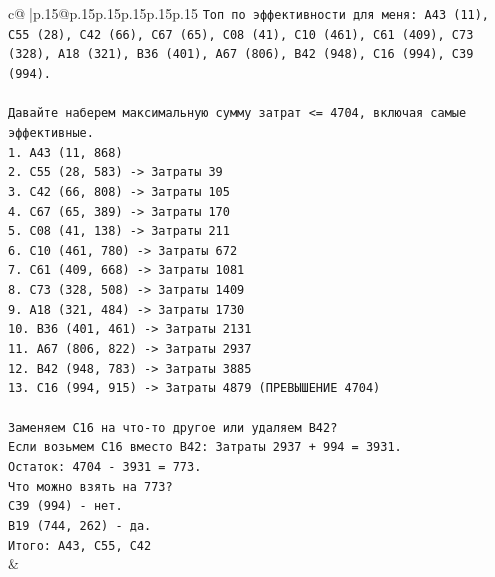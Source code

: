 \documentclass{article}
\begin{document}
{\begin{supertabular}{c@{$\;$}|p{.15\linewidth}@{}p{.15\linewidth}p{.15\linewidth}p{.15\linewidth}p{.15\linewidth}p{.15\linewidth}}
{{{\texttt{Топ по эффективности для меня: A43 (11), C55 (28), C42 (66), C67 (65), C08 (41), C10 (461), C61 (409), C73 (328), A18 (321), B36 (401), A67 (806), B42 (948), C16 (994), C39 (994).} \\
\\ 
\texttt{Давайте наберем максимальную сумму затрат <= 4704, включая самые эффективные.} \\
\texttt{1. A43 (11, 868)} \\
\texttt{2. C55 (28, 583) {-}> Затраты 39} \\
\texttt{3. C42 (66, 808) {-}> Затраты 105} \\
\texttt{4. C67 (65, 389) {-}> Затраты 170} \\
\texttt{5. C08 (41, 138) {-}> Затраты 211} \\
\texttt{6. C10 (461, 780) {-}> Затраты 672} \\
\texttt{7. C61 (409, 668) {-}> Затраты 1081} \\
\texttt{8. C73 (328, 508) {-}> Затраты 1409} \\
\texttt{9. A18 (321, 484) {-}> Затраты 1730} \\
\texttt{10. B36 (401, 461) {-}> Затраты 2131} \\
\texttt{11. A67 (806, 822) {-}> Затраты 2937} \\
\texttt{12. B42 (948, 783) {-}> Затраты 3885} \\
\texttt{13. C16 (994, 915) {-}> Затраты 4879 (ПРЕВЫШЕНИЕ 4704)} \\
\\ 
\texttt{Заменяем C16 на что{-}то другое или удаляем B42?} \\
\texttt{Если возьмем C16 вместо B42: Затраты 2937 + 994 = 3931.} \\
\texttt{Остаток: 4704 {-} 3931 = 773.} \\
\texttt{Что можно взять на 773?} \\
\texttt{C39 (994) {-} нет.} \\
\texttt{B19 (744, 262) {-} да.} \\
\texttt{Итого: A43, C55, C42} \\
            }
        }
    }
    & \\ \\


\end{supertabular}}
\end{document}
